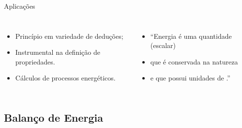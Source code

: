     \begin{frame}{Aplicações}\vspace*{-2em}
        \begin{columns}
        \begin{itemize}
            \item<1-> Princípio em variedade de \alert{deduções}; \\[\medskipamount]
            \item<2-> Instrumental na \alert{definição} de \alert{propriedades}.
                \\[\medskipamount]
            \item<3-> Cálculos de \alert{processos} energéticos. %
        \end{itemize}
        \begin{itemize}
            \item<6-> ``Energia é uma \alert{quantidade} (escalar) \\[\medskipamount]
            \item<7-> \hspace{1ex}que é \alert{conservada} na natureza \\[\medskipamount]
            \item<8-> \hspace{1ex}e que possui \alert{unidades de
                \kilogram\usk\squaren\meter\per\squaren\second}.'' %
        \end{itemize}
        \end{columns}
    \end{frame}

\subsection{Balanço de Energia}

